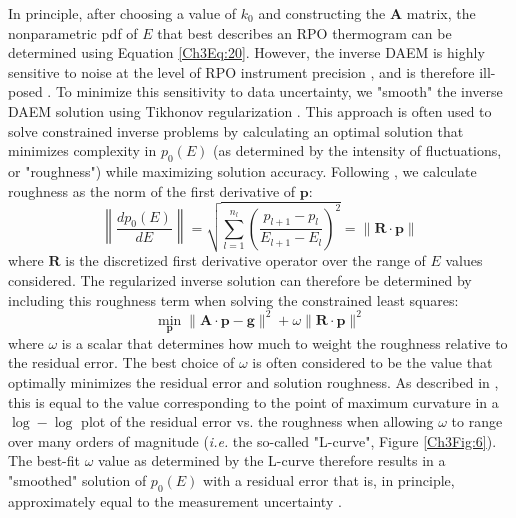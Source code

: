 In principle, after choosing a value of $k_{0}$ and constructing the $\mathbf{A}$ matrix, the nonparametric pdf of $E$ that best describes an RPO thermogram can be determined using Equation \ref{Ch3Eq:20}. However, the inverse DAEM is highly sensitive to noise at the level of RPO instrument precision \citep[\textit{i.e.} approximately \SI{\pm 5}{ppm.}, \SI{\pm 5}{\celsius};][]{Hemingway:2016rc}, and is therefore ill-posed \citep{Hansen:1994uc}. To minimize this sensitivity to data uncertainty, we "smooth" the inverse DAEM solution using Tikhonov regularization \citep{Tikhonov:1977ui,Hansen:1994uc,Forney:2012dr,Forney:2012hz}. This approach is often used to solve constrained inverse problems by calculating an optimal solution that minimizes complexity in $p_{0}(E)$ (as determined by the intensity of fluctuations, or "roughness") while maximizing solution accuracy. Following \citet{Forney:2012hz}, we calculate roughness as the norm of the first derivative of $\mathbf{p}$:
%
\begin{equation}\label{Ch3Eq:22}
	\left\| \frac{d p_{0}(E)}{dE} \right\| = \sqrt{ \sum_{l=1}^{n_{l}}\left( \frac{p_{l+1} - p_{l}}{E_{l+1} - E_{l}}\right)^{2}} = \| \mathbf{R} \cdot \mathbf{p} \| 
\end{equation}
%
where $\mathbf{R}$ is the discretized first derivative operator over the range of $E$ values considered. The regularized inverse solution can therefore be determined by including this roughness term when solving the constrained least squares:
%
\begin{equation}\label{Ch3Eq:23}
	\min_{\mathbf{p}} \| \mathbf{A} \cdot \mathbf{p} - \mathbf{g} \|^{2} + \omega \| \mathbf{R} \cdot \mathbf{p} \|^{2}
\end{equation}
%
where $\omega$ is a scalar that determines how much to weight the roughness relative to the residual error. The best choice of $\omega$ is often considered to be the value that optimally minimizes the residual error and solution roughness. As described in \citet{Hansen:1994uc}, this is equal to the value corresponding to the point of maximum curvature in a $\log-\log$ plot of the residual error vs. the roughness when allowing $\omega$ to range over many orders of magnitude (\textit{i.e.} the so-called "L-curve", Figure \ref{Ch3Fig:6}). The best-fit $\omega$ value as determined by the L-curve therefore results in a "smoothed" solution of $p_{0}(E)$ with a residual error that is, in principle, approximately equal to the measurement uncertainty \citep{Forney:2012hz}. 

